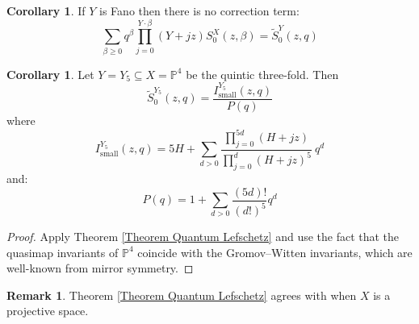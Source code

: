 \documentclass[11pt]{amsart}
\newcommand{\PP}{\mathbb P}
\theoremstyle{definition}
\newtheorem{cor}[thm]{Corollary}
\theoremstyle{definition}
\newtheorem{remark}[thm]{Remark}
\begin{document}
\begin{cor}
 If $Y$ is Fano then there is no correction term:
\begin{equation*} \sum_{\beta\geq 0} q^\beta\prod_{j=0}^{Y\cdot\beta}(Y+jz)S_0^X(z,\beta) = \tilde{S}_0^Y(z,q) \end{equation*}
\end{cor}

\begin{cor}
Let $Y = Y_5 \subseteq  X = \PP^4$ be the quintic three-fold. Then
\begin{equation*} \tilde{S}_0^{Y_5}(z,q)=\dfrac{I_{\text{small}}^{Y_5}(z,q)}{P(q)} \end{equation*}
where
\begin{equation*} I_{\text{small}}^{Y_5}(z,q)=5H+\sum_{d>0}\frac{\prod_{j=0}^{5d}(H+jz)}{\prod_{j=0}^{d}(H+jz)^5} \ q^d \end{equation*}
and:
\begin{equation*} P(q)=1+\sum_{d>0}\frac{(5d)!}{(d!)^5}q^d \end{equation*}
\end{cor}
\begin{proof} Apply Theorem \ref{Theorem Quantum Lefschetz} and use the fact that the quasimap invariants of $\PP^4$ coincide with the Gromov--Witten invariants, which are well-known from mirror symmetry. \end{proof}

\begin{remark}
Theorem \ref{Theorem Quantum Lefschetz} agrees with \cite[Theorem~1]{CZ-mirror} when $X$ is a projective space.
\end{remark}
\end{document}

